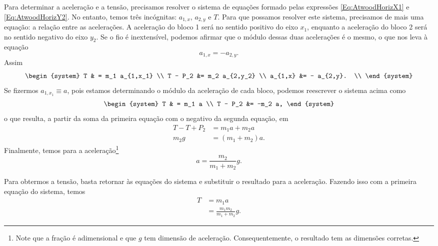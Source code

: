 Para determinar a aceleração e a tensão, precisamos resolver o sistema de equações formado pelas expressões \eqref{Eq:AtwoodHorizX1} e \eqref{Eq:AtwoodHorizY2}. No entanto, temos três incógnitas: $a_{1,x}$, $a_{2,y}$ e $T$. Para que possamos resolver este sistema, precisamos de mais uma equação: a relação entre as acelerações. A aceleração do bloco 1 será no sentido positivo do eixo $x_1$, enquanto a aceleração do bloco 2 será no sentido negativo do eixo $y_2$. Se o fio é inextensível, podemos afirmar que o módulo dessas duas acelerações é o mesmo, o que nos leva à equação
\begin{equation}\label{Eq:AtwoodHorizRelAcel}
    a_{1,x} = - a_{2,y}.
\end{equation}
%
Assim
\begin{equation}
\begin{system}
T & = m_1 a_{1,x_1} \\
T - P_2 &= m_2 a_{2,y_2} \\
a_{1,x} &= - a_{2,y}. \\
\end{system}
\end{equation}
%
Se fizermos $a_{1,x_1} \equiv a$, pois estamos determinando o módulo da aceleração de cada bloco, podemos reescrever o sistema acima como
\begin{equation}
\begin{system}
T & = m_1 a \\
T - P_2 &= -m_2 a,
\end{system}
\end{equation}
%
o que resulta, a partir da soma da primeira equação com o negativo da segunda equação, em
\begin{align}
    T - T + P_2 &= m_1 a + m_2 a \\
    m_2 g &= (m_1 + m_2) a.
\end{align}
%
Finalmente, temos para a aceleração\footnote{Note que a fração é adimensional e que $g$ tem dimensão de aceleração. Consequentemente, o resultado tem as dimensões corretas.}
\begin{equation}\label{Eq:MaquinaAtwoodHorizResultAcel}
    a = \frac{m_2}{m_1+m_2} g.
\end{equation}

Para obtermos a tensão, basta retornar às equações do sistema e substituir o resultado para a aceleração. Fazendo isso com a primeira equação do sistema, temos
\begin{align}
    T &= m_1 a\\
    &= \frac{m_1m_2}{m_1+m_2} g. \label{Eq:MaquinaAtwoodHorizResultTensao}
\end{align}

